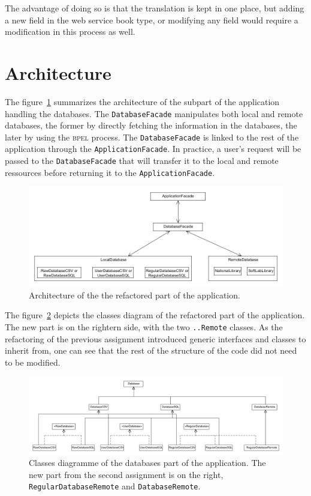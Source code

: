 \documentclass[a4paper,10pt]{article}
\begin{document}
The advantage of doing so is that the translation is kept in one place, but adding a new field in the web service book type, or modifying any field would require a modification in this process as well.



\section{Architecture}
The figure~\ref{fig:arch} summarizes the architecture of the subpart of the application handling the databases.
The \texttt{DatabaseFacade} manipulates both local and remote databases, the former by directly fetching the information in the databases, the later by using the \textsc{bpel} process.
The \texttt{DatabaseFacade} is linked to the rest of the application through the \texttt{ApplicationFacade}.
In practice, a user's request will be passed to the \texttt{DatabaseFacade} that will transfer it to the local and remote ressources before returning it to the \texttt{ApplicationFacade}.

\begin{figure}[h]
\centering
\includegraphics[width=\textwidth]{Architecture.png}
\caption{Architecture of the the refactored part of the application.}
\label{fig:arch}
\end{figure}

The figure~\ref{fig:classes} depicts the classes diagram of the refactored part of the application. The new part is on the rightern side, with the two \texttt{..Remote} classes.
As the refactoring of the previous assignment introduced generic interfaces and classes to inherit from, one can see that the rest of the structure of the code did not need to be modified.

\begin{figure}[h]
\centering
\includegraphics[width=\textwidth]{diagrammeClasses.png}
\caption{Classes diagramme of the databases part of the application. The new part from the second assignment is on the right, \texttt{RegularDatabaseRemote} and \texttt{DatabaseRemote}.}
\label{fig:classes}
\end{figure}
\end{document}
